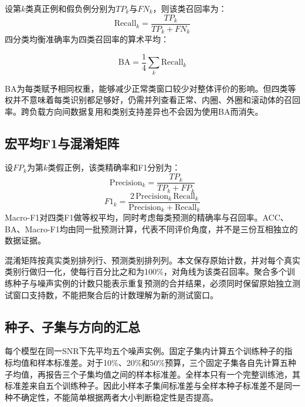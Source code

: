 \documentclass[UTF8,12pt,openany,twoside]{ctexbook}
\numberwithin{equation}{chapter}
\begin{document}
设第$k$类真正例和假负例分别为$TP_k$与$FN_k$，则该类召回率为：
\begin{equation}
\label{eq:auto17}
\mathrm{Recall}_k=\frac{TP_k}{TP_k+FN_k}
\end{equation}
四分类均衡准确率为四类召回率的算术平均：

\begin{equation}
\label{eq:auto18}
\mathrm{BA}=\frac{1}{4}\sum_k\mathrm{Recall}_k
\end{equation}


BA为每类赋予相同权重，能够减少正常类窗口较少对整体评价的影响。但四类等权并不意味着每类识别都足够好，仍需并列查看正常、内圈、外圈和滚动体的召回率。跨负载方向间数据复用和类别支持差异也不会因为使用BA而消失。

\subsection{宏平均F1与混淆矩阵}\label{ux5b8fux5e73ux5747f1ux4e0eux6df7ux6dc6ux77e9ux9635}

设$FP_k$为第$k$类假正例，该类精确率和F1分别为：
\begin{equation}
\label{eq:auto19}
\mathrm{Precision}_k=\frac{TP_k}{TP_k+FP_k}
\end{equation}
\begin{equation}
\label{eq:auto20}
F1_k=\frac{2\,\mathrm{Precision}_k\,\mathrm{Recall}_k}{\mathrm{Precision}_k+\mathrm{Recall}_k}
\end{equation}
Macro-F1对四类F1做等权平均，同时考虑每类预测的精确率与召回率。ACC、BA、Macro-F1均由同一批预测计算，代表不同评价角度，并不是三份互相独立的数据证据。

混淆矩阵按真实类别排列行、预测类别排列列。本文保存原始计数，并对每个真实类别行做归一化，使每行百分比之和为100\%，对角线为该类召回率。聚合多个训练种子与噪声实例的计数只能表示重复预测的合并结果，必须同时保留原始独立测试窗口支持数，不能把聚合后的计数理解为新的测试窗口。

\subsection{种子、子集与方向的汇总}\label{ux79cdux5b50ux5b50ux96c6ux4e0eux65b9ux5411ux7684ux6c47ux603b}

每个模型在同一SNR下先平均五个噪声实例。固定子集内计算五个训练种子的指标均值和样本标准差。对于10\%、20\%和50\%预算，三个固定子集各自先计算五种子均值，再报告三个子集均值之间的样本标准差。全样本只有一个完整训练池，其标准差来自五个训练种子。因此小样本子集间标准差与全样本种子标准差不是同一种不确定性，不能简单根据两者大小判断稳定性是否提高。
\end{document}

